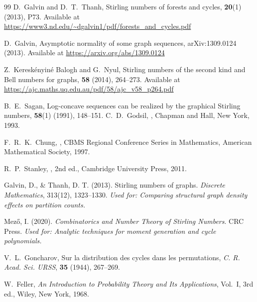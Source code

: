 \documentclass{amsart}
\theoremstyle{definition}
\begin{document}
\begin{thebibliography}{99}
D.~Galvin and D.~T.~Thanh,
\newblock Stirling numbers of forests and cycles,
 \textbf{20}(1) (2013), P73.
\newblock Available at \url{https://www3.nd.edu/~dgalvin1/pdf/forests_and_cycles.pdf}

D.~Galvin,
\newblock Asymptotic normality of some graph sequences,
 arXiv:1309.0124 (2013).
\newblock Available at \url{https://arxiv.org/abs/1309.0124}

Z.~Keresk{\'e}nyin{\'e} Balogh and G.~Nyul,
\newblock Stirling numbers of the second kind and Bell numbers for graphs,
 \textbf{58} (2014), 264--273.
\newblock Available at \url{https://ajc.maths.uq.edu.au/pdf/58/ajc_v58_p264.pdf}

B.~E.~Sagan,
\newblock Log-concave sequences can be realized by the graphical Stirling numbers,
 \textbf{58}(1) (1991),
148--151.
C.~D.~Godsil,
,
\newblock Chapman and Hall, New York, 1993.

F.~R.~K.~Chung,
,
\newblock CBMS Regional Conference Series in Mathematics,
American Mathematical Society, 1997.

R.~P.~Stanley,
, 2nd ed.,
\newblock Cambridge University Press, 2011.

Galvin, D., \& Thanh, D. T. (2013). Stirling numbers of graphs. \textit{Discrete Mathematics}, 313(12), 1323--1330.
\newblock \textit{Used for: Comparing structural graph density effects on partition counts.}

Mező, I. (2020). \textit{Combinatorics and Number Theory of Stirling Numbers}. CRC Press.
\newblock \textit{Used for: Analytic techniques for moment generation and cycle polynomials.}


V.~L.~Goncharov,
\newblock Sur la distribution des cycles dans les permutations,
\newblock \emph{C. R. Acad. Sci. URSS}, \textbf{35} (1944), 267--269.

W.~Feller,
\newblock \emph{An Introduction to Probability Theory and Its Applications},
Vol.~I, 3rd ed.,
\newblock Wiley, New York, 1968.


\end{thebibliography}
\end{document}
